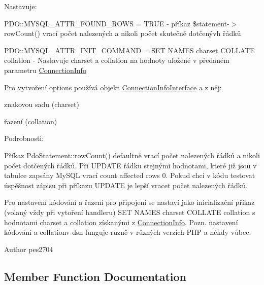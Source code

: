 Nastavuje\+:


\begin{DoxyItemize}
\item P\+D\+O\+::\+M\+Y\+S\+Q\+L\+\_\+\+A\+T\+T\+R\+\_\+\+F\+O\+U\+N\+D\+\_\+\+R\+O\+WS = T\+R\+UE -\/ příkaz \$statement-\/$>$row\+Count() vrací počet nalezených a nikoli počet skutečně dotčenývh řádků 
\item P\+D\+O\+::\+M\+Y\+S\+Q\+L\+\_\+\+A\+T\+T\+R\+\_\+\+I\+N\+I\+T\+\_\+\+C\+O\+M\+M\+A\+ND = S\+ET N\+A\+M\+ES charset C\+O\+L\+L\+A\+TE collation -\/ Nastavuje charset a collation na hodnoty uložené v předaném parametru \mbox{\hyperlink{class_pes_1_1_database_1_1_handler_1_1_connection_info}{Connection\+Info}}
\end{DoxyItemize}

Pro vytvoření options používá objekt \mbox{\hyperlink{interface_pes_1_1_database_1_1_handler_1_1_connection_info_interface}{Connection\+Info\+Interface}} a z něj\+: 
\begin{DoxyItemize}
\item znakovou sadu (charset) 
\item řazení (collation)
\end{DoxyItemize}

Podrobnosti\+:

Příkaz Pdo\+Statement\+::row\+Count() defaultně vrací počet nalezených řádků a nikoli počet dotčených řádků. Při U\+P\+D\+A\+TE řádku stejnými hodnotami, které již jsou v tabulce zapsány My\+S\+QL vrací count affected rows 0. Pokud chci v kódu testovat úspěšnost zápisu při příkazu U\+P\+D\+A\+TE je lepší vracet počet nalezených řádků.

Pro nastavení kódování a řazení pro připojení se nastaví jako inicializační příkaz (volaný vždy při vytoření handleru) S\+ET N\+A\+M\+ES charset C\+O\+L\+L\+A\+TE collation s hodnotami charset a collation získanými z \mbox{\hyperlink{class_pes_1_1_database_1_1_handler_1_1_connection_info}{Connection\+Info}}. Pozn. nastavení kódování a collationv dsn funguje různě v různých verzích P\+HP a někdy vůbec.

\begin{DoxyAuthor}{Author}
pes2704 
\end{DoxyAuthor}


\subsection{Member Function Documentation}
\mbox{\label{class_pes_1_1_database_1_1_handler_1_1_options_provider_1_1_options_provider_mysql_a7762424987993a98ba044cf1715dd44f}} 
